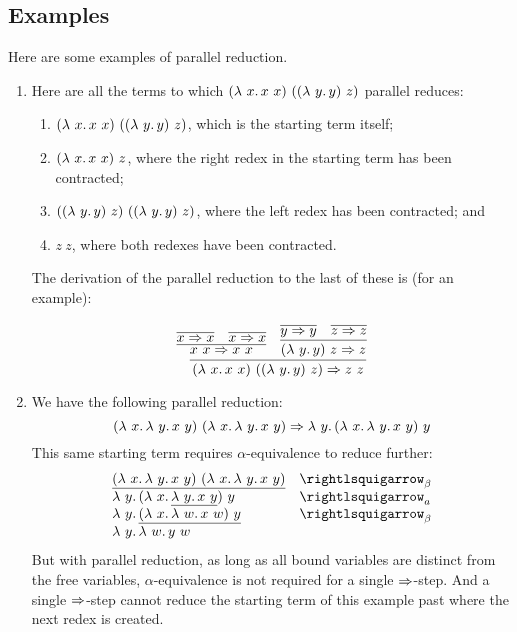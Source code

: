 \subsection{Examples}

Here are some examples of parallel reduction.

\begin{enumerate}
\item Here are all the terms to which $(\lam{x}{x\ x})\ ((\lam{y}{y})\ z)$ parallel reduces:
  \begin{enumerate}
  \item $(\lam{x}{x\ x})\ ((\lam{y}{y})\ z)$, which is the starting term itself;
  \item $(\lambda\ x.\, x\ x)\ z$, where the right redex in the starting term has been contracted;
  \item $((\lam{y}{y})\ z)\ ((\lam{y}{y})\ z)$, where the left redex has been contracted; and
  \item $z\ z$, where both redexes have been contracted.
  \end{enumerate}

  The derivation of the parallel reduction to the last of these is (for an example):

  \[
  \infer{(\lam{x}{x\ x})\ ((\lam{y}{y})\ z) \Pred z\ z}
        {\infer{x\ x \Pred x\ x}{\infer{x \Pred x}{\ } & \infer{x \Pred x}{\ }} & 
          \infer{(\lam{y}{y})\ z \Pred z}
                {\infer{y \Pred y}{\ } &
                  \infer{z \Pred z}{\ }}}
   \]

 \item We have the following parallel reduction:
   \[
   (\lam{x}{\lam{y}{x\ y}})\ (\lam{x}{\lam{y}{x\ y}}) \Pred \lam{y}{(\lam{x}{\lam{y}{x\ y}})\ y}
   \]
   \noindent This same starting term requires $\alpha$-equivalence to reduce further:
   \[
   \begin{array}{ll}
     \underline{(\lam{x}{\lam{y}{x\ y}})\ (\lam{x}{\lam{y}{x\ y}})} &\curva_\beta \\
     \lam{y}{(\lam{x}{\underline{\lam{y}{x\ y}}})\ y} & \curva_a \\
     \lam{y}{\underline{(\lam{x}{\lam{w}{x\ w}})\ y}} & \curva_\beta \\
     \lam{y}{\lam{w}{y\ w}} & \
   \end{array}
   \]
   \noindent But with parallel reduction, as long as all bound variables are distinct from the free variables,
   $\alpha$-equivalence is not required for a single $\Rightarrow$-step.  And a single $\Rightarrow$-step cannot reduce the starting term of this example past where the next redex is created.

\end{enumerate}

